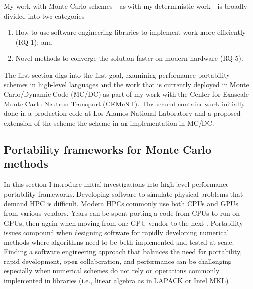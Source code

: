 
My work with Monte Carlo schemes---as with my deterministic work---is broadly divided into two categories
\begin{enumerate}
    \item How to use software engineering libraries to implement work more efficiently (RQ 1); and
    \item Novel methods to converge the solution faster on modern hardware (RQ 5).
\end{enumerate}
The first section digs into the first goal, examining performance portability schemes in high-level languages and the work that is currently deployed in Monte Carlo/Dynamic Code (MC/DC) as part of my work with the Center for Exascale Monte Carlo Neutron Transport (CEMeNT).
The second contains work initially done in a production code at Los Alamos National Laboratory and a proposed extension of the scheme the scheme in an implementation in MC/DC.

\subsection{Portability frameworks for Monte Carlo methods}

In this section I introduce initial investigations into high-level performance portability frameworks.
Developing software to simulate physical problems that demand HPC is difficult.
Modern HPCs commonly use both CPUs and GPUs from various vendors.
Years can be spent porting a code from CPUs to run on GPUs, then again when moving from one GPU vendor to the next \cite{pozulp_progress_2023}.
Portability issues compound when designing software for rapidly developing numerical methods where algorithms need to be both implemented and tested at scale.
Finding a software engineering approach that balances the need for portability, rapid development, open collaboration, and performance can be challenging especially when numerical schemes do not rely on operations commonly implemented in libraries   (i.e., linear algebra as in LAPACK or Intel MKL). 

